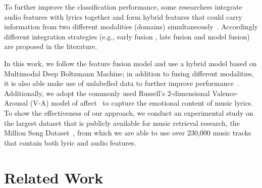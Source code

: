 \documentclass{llncs}
\begin{document}
To further improve the classification performance, some researchers integrate audio features with lyrics together and form hybrid features that could carry information from two different modalities (domains) simultaneously~\cite{DBLP:conf/ismir/HuDE09}. Accordingly different integration strategies (e.g., early fusion \cite{DBLP:conf/ismir/HuD10}, late fusion\cite{DBLP:conf/icmla/LaurierGH08} and model fusion\cite{DBLP:conf/mmm/XueXS15}) are proposed in the literature. %

In this work, we follow the feature fusion model and use a hybrid model based on Multimodal Deep Boltzmann Machine; in addition to fusing different modalities, it is also able make use of unlabelled data to further improve performance~\cite{DBLP:journals/jmlr/SrivastavaS14}. Additionally, we adopt the commonly used Russell's 2-dimensional Valence-Arousal (V-A) model of affect~\cite{Russell1980} to capture the emotional content of music lyrics. To show the effectiveness of our approach, we conduct an experimental study on the largest dataset that is publicly available for music retrieval research, the Million Song Dataset~\cite{DBLP:conf/ismir/Bertin-MahieuxEWL11}, from which we are able to use over 230,000 music tracks that contain both lyric and audio features.  %




\section{Related Work}
\end{document}
